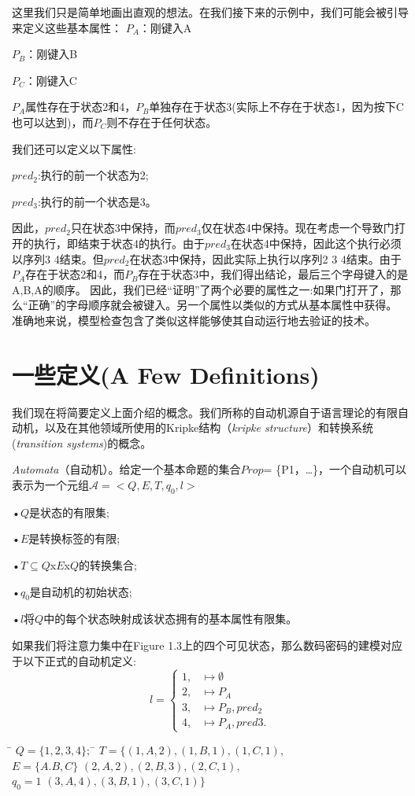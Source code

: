 \documentclass{book}
\begin{document}
    这里我们只是简单地画出直观的想法。在我们接下来的示例中，我们可能会被引导来定义这些基本属性：
    $P_A$：刚键入A

    $P_B$：刚键入B

    $P_C$：刚键入C

    $P_A$属性存在于状态2和4，$P_B$单独存在于状态3(实际上不存在于状态1，因为按下C也可以达到)，而$P_C$则不存在于任何状态。

    我们还可以定义以下属性:

    $pred_2$:执行的前一个状态为2;

    $pred_3$:执行的前一个状态是3。


    因此，$pred_2$只在状态3中保持，而$pred_3$仅在状态4中保持。现在考虑一个导致门打开的执行，即结束于状态4的执行。由于$pred_3$在状态4中保持，因此这个执行必须以序列3 4结束。但$pred_2$在状态3中保持，因此实际上执行以序列2 3 4结束。由于$P_A$存在于状态2和4，而$P_B$存在于状态3中，我们得出结论，最后三个字母键入的是A,B,A的顺序。
    因此，我们已经“证明”了两个必要的属性之一:如果门打开了，那么“正确”的字母顺序就会被键入。另一个属性以类似的方式从基本属性中获得。
    准确地来说，模型检查包含了类似这样能够使其自动运行地去验证的技术。

    \section{一些定义(A Few Definitions)}

    我们现在将简要定义上面介绍的概念。我们所称的自动机源自于语言理论的有限自动机，以及在其他领域所使用的Kripke结构（{\itshape kripke structure}）和转换系统({\itshape transition systems})的概念。

    {\itshape  Automata}（自动机）。给定一个基本命题的集合$Prop$= \{P1，…\}，一个自动机可以表示为一个元组$\mathcal{A}=<Q, E, T, q_0, l>$

    •$Q$是状态的有限集;

    •$E$是转换标签的有限;

    •$T \subseteq Q$x$E$x$Q$的转换集合;

    •$q_0$是自动机的初始状态;

    •$l$将$Q$中的每个状态映射成该状态拥有的基本属性有限集。

    如果我们将注意力集中在Figure 1.3上的四个可见状态，那么数码密码的建模对应于以下正式的自动机定义:
    \begin{equation*}
        l=
        \begin{cases}
            1, & \mapsto{\emptyset}\\
            2, & \mapsto{P_A}\\
            3, & \mapsto{P_B,pred_2}\\
            4, & \mapsto{P_A,pred3}.
        \end{cases}
    \end{equation*}
    \begin{tabbing}
        \= $Q=\{1,2,3,4\};$ \quad   \= $T=\{(1,A,2),(1,B,1),(1,C,1),$ \\
        \> $E=\{A.B,C\}$      \> $(2,A,2),(2,B,3),(2,C,1),$\\
        \> $q_0=1$            \> $(3,A,4),(3,B,1),(3,C,1)\}$\\
    \end{tabbing}
\end{document}
